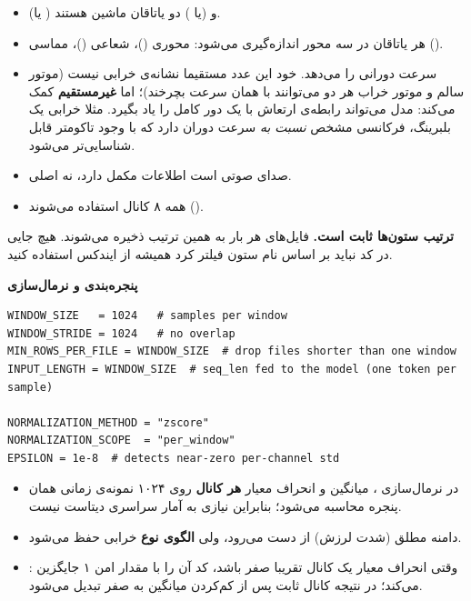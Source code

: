 \documentclass{article}
\newcommand{\pmdash}{\lr{---}}
\newcommand{\mysubsection}[1]{
\par\vspace{0.5cm}
\noindent\textcolor{main_blue}{\large\textbf{#1}}
\par\vspace{0.2cm}
}
\newcommand{\infobox}[1]{%
\vspace{0.3cm}%
\begin{tcolorbox}[
  colback=code_bg,
  colframe=light_gray,
  arc=3pt,
  boxrule=0.5pt,
  left=8pt, right=8pt, top=6pt, bottom=6pt,
  boxsep=0pt
]
#1
\end{tcolorbox}%
\vspace{0.1cm}%
}
\begin{document}
\begin{itemize}
\item {} (یا ) و  (یا ) دو یاتاقان ماشین  هستند.
\item هر یاتاقان در سه محور اندازه‌گیری می‌شود: محوری ()، شعاعی ()، مماسی ().
\item {} سرعت دورانی را می‌دهد. خود این عدد مستقیما نشانه‌ی خرابی نیست
(موتور سالم و موتور خراب هر دو می‌توانند با همان سرعت بچرخند)؛ اما
\textbf{غیرمستقیم} کمک می‌کند: مدل می‌تواند رابطه‌ی ارتعاش با یک دور کامل را یاد بگیرد.
مثلا خرابی  یک بلبرینگ، فرکانسی مشخص \emph{نسبت به} سرعت دوران دارد
که با وجود تاکومتر قابل شناسایی‌تر می‌شود.
\item {} صدای صوتی است \pmdash{} اطلاعات مکمل دارد، نه اصلی.
\item همه ۸ کانال استفاده می‌شوند ().
\end{itemize}

\infobox{
\textbf{ترتیب ستون‌ها ثابت است.} فایل‌های \lr{MAFAULDA} هر بار به همین ترتیب ذخیره می‌شوند.
هیچ جایی در کد نباید بر اساس نام ستون فیلتر کرد \pmdash{} همیشه از ایندکس استفاده کنید.
}

\mysubsection{پنجره‌بندی و نرمال‌سازی}

\begin{latin}
\begin{lstlisting}
WINDOW_SIZE   = 1024   # samples per window
WINDOW_STRIDE = 1024   # no overlap
MIN_ROWS_PER_FILE = WINDOW_SIZE  # drop files shorter than one window
INPUT_LENGTH = WINDOW_SIZE  # seq_len fed to the model (one token per sample)

NORMALIZATION_METHOD = "zscore"
NORMALIZATION_SCOPE  = "per_window"
EPSILON = 1e-8  # detects near-zero per-channel std
\end{lstlisting}
\end{latin}

\begin{itemize}
\item در نرمال‌سازی ، میانگین و انحراف معیار \textbf{هر کانال}
روی ۱۰۲۴ نمونه‌ی زمانی همان پنجره محاسبه می‌شود؛ بنابراین نیازی به آمار سراسری دیتاست نیست.
\item دامنه مطلق (شدت لرزش) از دست می‌رود، ولی \textbf{الگوی نوع} خرابی حفظ می‌شود.
\item {}: وقتی انحراف معیار یک کانال تقریبا صفر باشد، کد آن را با مقدار امن
۱ جایگزین می‌کند؛ در نتیجه کانال ثابت پس از کم‌کردن میانگین به صفر تبدیل می‌شود.
\end{itemize}
\end{document}
